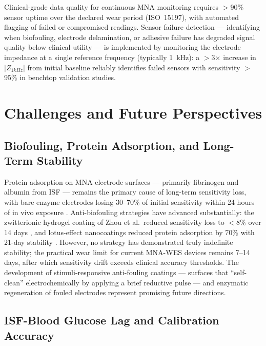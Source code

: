 \documentclass[review,1p]{elsarticle}
\begin{document}
Clinical-grade data quality for continuous MNA monitoring requires $>$90\% sensor uptime over the declared wear period (ISO~15197), with automated flagging of failed or compromised readings. Sensor failure detection — identifying when biofouling, electrode delamination, or adhesive failure has degraded signal quality below clinical utility — is implemented by monitoring the electrode impedance at a single reference frequency (typically 1~kHz): a $>$3$\times$ increase in $|Z_{1kHz}|$ from initial baseline reliably identifies failed sensors with sensitivity $>$95\% in benchtop validation studies.


\section{Challenges and Future Perspectives}
\label{sec:challenges}

\subsection{Biofouling, Protein Adsorption, and Long-Term Stability}
\label{subsec:biofouling}

Protein adsorption on MNA electrode surfaces — primarily fibrinogen and albumin from ISF — remains the primary cause of long-term sensitivity loss, with bare enzyme electrodes losing 30--70\% of initial sensitivity within 24 hours of in vivo exposure \cite{Ryu2022Lotus}. Anti-biofouling strategies have advanced substantially: the zwitterionic hydrogel coating of Zhou et al.\ reduced sensitivity loss to $<$8\% over 14 days \cite{Zhou2024}, and lotus-effect nanocoatings reduced protein adsorption by 70\% with 21-day stability \cite{Ryu2022Lotus}. However, no strategy has demonstrated truly indefinite stability; the practical wear limit for current MNA-WES devices remains 7--14 days, after which sensitivity drift exceeds clinical accuracy thresholds. The development of stimuli-responsive anti-fouling coatings — surfaces that ``self-clean'' electrochemically by applying a brief reductive pulse — and enzymatic regeneration of fouled electrodes represent promising future directions.

\subsection{ISF-Blood Glucose Lag and Calibration Accuracy}
\label{subsec:lag}
\end{document}
